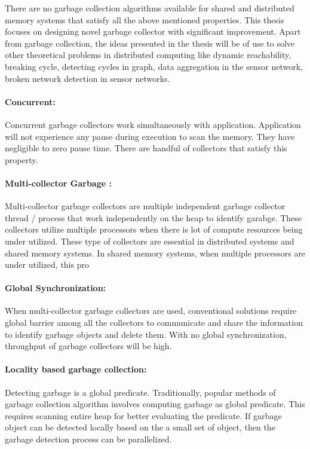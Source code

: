 There are no garbage collection algorithms available for shared and distributed memory systems that satisfy all the above mentioned properties.  This thesis focuses on designing novel garbage collector with significant improvement. Apart from garbage collection, the ideas presented in the thesis will be of use to solve other theoretical problems in distributed computing like dynamic reachability, breaking cycle, detecting cycles in graph, data aggregation in the sensor network, broken network detection in sensor networks.


\paragraph{Concurrent:}
	Concurrent garbage collectors work simultaneously with application. Application will not experience any pause during execution to scan the memory. They
	have negligible to zero pause time. There are handful of collectors that satisfy this property. 
\paragraph{Multi-collector Garbage :}
	Multi-collector garbage collectors are multiple independent garbage collector thread / process that work independently on the heap to identify garabge. These collectors utilize multiple processors when there is lot of compute resources being under utilized. These type of collectors are essential in distributed systems and shared memory systems. In shared memory systems, when multiple processors are under utilized, this pro
\paragraph{Global Synchronization:}
	When multi-collector garbage collectors are used, conventional solutions require global barrier among all the collectors to communicate and share the information to identify garbage objects and delete them. With no global synchronization, throughput of garbage collectors will be high.
\paragraph{Locality based garbage collection:}
	Detecting garbage is a global predicate. Traditionally, popular methods of garbage collection algorithm involves computing garbage as global predicate. This requires scanning entire heap for better evaluating the predicate. If garbage object can be detected locally based on the a small set of object, then the garbage detection process can be parallelized.
